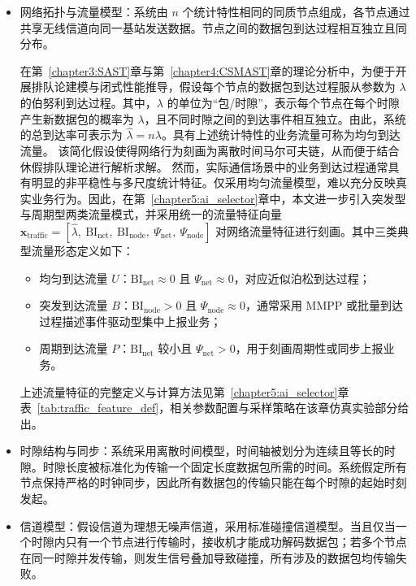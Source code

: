 \begin{itemize}
	\item 网络拓扑与流量模型：系统由 $n$ 个统计特性相同的同质节点组成，各节点通过共享无线信道向同一基站发送数据。节点之间的数据包到达过程相互独立且同分布。
	
	在第~\ref{chapter3:SAST}章与第~\ref{chapter4:CSMAST}章的理论分析中，为便于开展排队论建模与闭式性能推导，假设每个节点的数据包到达过程服从参数为 $\lambda$ 的伯努利到达过程。其中，$\lambda$ 的单位为“包/时隙”，表示每个节点在每个时隙产生新数据包的概率为 $\lambda$，且不同时隙之间的到达事件相互独立。由此，系统的总到达率可表示为 $\hat{\lambda}=n\lambda$。具有上述统计特性的业务流量可称为均匀到达流量。
	该简化假设使得网络行为刻画为离散时间马尔可夫链，从而便于结合休假排队理论进行解析求解。
	然而，实际通信场景中的业务到达过程通常具有明显的非平稳性与多尺度统计特征。仅采用均匀流量模型，难以充分反映真实业务行为。因此，在第~\ref{chapter5:ai_selector}章中，本文进一步引入突发型与周期型两类流量模式，并采用统一的流量特征向量
	$\mathbf{x}_{\text{traffic}}=[\hat{\lambda},\ \mathrm{BI}_{\mathrm{net}},\ \mathrm{BI}_{\mathrm{node}},\ \Psi_{\mathrm{net}},\ \Psi_{\mathrm{node}}]$
	对网络流量特征进行刻画。其中三类典型流量形态定义如下：
	\begin{itemize}

		\item 均匀到达流量 $U$：$\mathrm{BI}_{\mathrm{net}} \approx 0$ 且 $\Psi_{\mathrm{net}} \approx 0$，对应近似泊松到达过程；

		\item 突发到达流量 $B$：$\mathrm{BI}_{\mathrm{node}} > 0$ 且 $\Psi_{\mathrm{node}} \approx 0$，通常采用 MMPP 或批量到达过程描述事件驱动型集中上报业务；

		\item 周期到达流量 $P$：$\mathrm{BI}_{\mathrm{net}}$ 较小且 $\Psi_{\mathrm{net}} > 0$，用于刻画周期性或同步上报业务。
	\end{itemize}
	上述流量特征的完整定义与计算方法见第~\ref{chapter5:ai_selector}章表~\ref{tab:traffic_feature_def}，相关参数配置与采样策略在该章仿真实验部分给出。

	\item 时隙结构与同步：系统采用离散时间模型，时间轴被划分为连续且等长的时隙。时隙长度被标准化为传输一个固定长度数据包所需的时间。系统假定所有节点保持严格的时钟同步，因此所有数据包的传输只能在每个时隙的起始时刻发起。
	
	\item 信道模型：假设信道为理想无噪声信道，采用标准碰撞信道模型。当且仅当一个时隙内只有一个节点进行传输时，接收机才能成功解码数据包；若多个节点在同一时隙并发传输，则发生信号叠加导致碰撞，所有涉及的数据包均传输失败。
	

\end{itemize}
